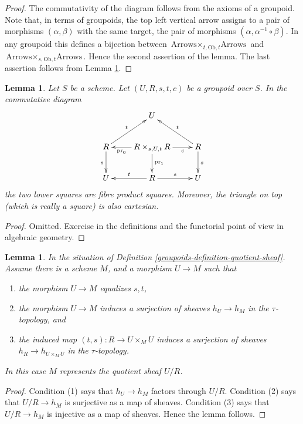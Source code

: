 \documentclass{amsart}
\theoremstyle{plain}
\newtheorem{lemma}[subsection]{Lemma}
\theoremstyle{definition}
\theoremstyle{remark}
\numberwithin{equation}{subsection}
\begin{document}
\begin{proof}
The commutativity of the diagram follows from the axioms of a groupoid.
Note that, in terms of groupoids, the top left vertical arrow assigns to
a pair of morphisms $(\alpha, \beta)$ with the same target, the pair
of morphisms $(\alpha, \alpha^{-1} \circ \beta)$. In any groupoid
this defines a bijection between
$\text{Arrows} \times_{t, \text{Ob}, t} \text{Arrows}$
and
$\text{Arrows} \times_{s, \text{Ob}, t} \text{Arrows}$. Hence the second
assertion of the lemma.
The last assertion follows from Lemma \ref{groupoids-lemma-diagram}.
\end{proof}


\begin{lemma}
\label{groupoids-lemma-diagram}
Let $S$ be a scheme.
Let $(U, R, s, t, c)$ be a groupoid over $S$.
In the commutative diagram
$$
\xymatrix{
& U & \\
R \ar[d]_s \ar[ru]^t &
R \times_{s, U, t} R
\ar[l]^-{\text{pr}_0} \ar[d]^{\text{pr}_1} \ar[r]_-c &
R \ar[d]^s \ar[lu]_t \\
U & R \ar[l]_t \ar[r]^s & U
}
$$
the two lower squares are fibre product squares.
Moreover, the triangle on top (which is really a square)
is also cartesian.
\end{lemma}

\begin{proof}
Omitted.
Exercise in the definitions and the functorial point of
view in algebraic geometry.
\end{proof}


\begin{lemma}
\label{groupoids-lemma-criterion-quotient-representable}
In the situation of Definition \ref{groupoids-definition-quotient-sheaf}.
Assume there is a scheme $M$, and a morphism $U \to M$ such that
\begin{enumerate}
\item the morphism $U \to M$ equalizes $s, t$,
\item the morphism $U \to M$ induces a surjection of sheaves
$h_U \to h_M$ in the $\tau$-topology, and
\item the induced map $(t, s) : R \to U \times_M U$ induces a
surjection of sheaves $h_R \to h_{U \times_M U}$ in the $\tau$-topology.
\end{enumerate}
In this case $M$ represents the quotient sheaf $U/R$.
\end{lemma}

\begin{proof}
Condition (1) says that $h_U \to h_M$ factors through $U/R$.
Condition (2) says that $U/R \to h_M$ is surjective as a map of sheaves.
Condition (3) says that $U/R \to h_M$ is injective as a map of sheaves.
Hence the lemma follows.
\end{proof}
\end{document}
